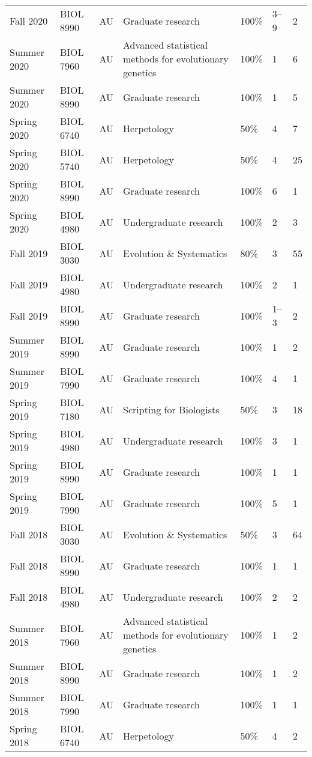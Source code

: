 {\begin{longtable}[l]{ p{0.79in} p{0.65in} p{0.60in} p{1.7in} p{0.58in} p{0.34in} p{0.70in} }
    Fall 2020 & BIOL 8990 & AU & Graduate research & 100\% & 3--9 & 2 \\ 
    Summer 2020 & BIOL 7960 & AU & Advanced statistical methods for evolutionary genetics & 100\% & 1 & 6 \\
    Summer 2020 & BIOL 8990 & AU & Graduate research & 100\% & 1 & 5 \\ 
    Spring 2020 & BIOL 6740 & AU & Herpetology & 50\% & 4 & 7 \\
    Spring 2020 & BIOL 5740 & AU & Herpetology & 50\% & 4 & 25 \\
    Spring 2020 & BIOL 8990 & AU & Graduate research & 100\% & 6 & 1 \\ 
    Spring 2020 & BIOL 4980 & AU & Undergraduate research & 100\% & 2 & 3 \\ 
    Fall 2019 & BIOL 3030 & AU & Evolution \& Systematics & 80\% & 3 & 55 \\
    Fall 2019 & BIOL 4980 & AU & Undergraduate research & 100\% & 2 & 1 \\ 
    Fall 2019 & BIOL 8990 & AU & Graduate research & 100\% & 1--3 & 2 \\ 
    Summer 2019 & BIOL 8990 & AU & Graduate research & 100\% & 1 & 2 \\ 
    Summer 2019 & BIOL 7990 & AU & Graduate research & 100\% & 4 & 1 \\ 
    Spring 2019 & BIOL 7180 & AU & Scripting for Biologists & 50\% & 3 & 18 \\
    Spring 2019 & BIOL 4980 & AU & Undergraduate research & 100\% & 3 & 1 \\ 
    Spring 2019 & BIOL 8990 & AU & Graduate research & 100\% & 1 & 1 \\ 
    Spring 2019 & BIOL 7990 & AU & Graduate research & 100\% & 5 & 1 \\ 
    Fall 2018 & BIOL 3030 & AU & Evolution \& Systematics & 50\% & 3 & 64 \\
    Fall 2018 & BIOL 8990 & AU & Graduate research & 100\% & 1 & 1 \\ 
    Fall 2018 & BIOL 4980 & AU & Undergraduate research & 100\% & 2 & 2 \\ 
    Summer 2018 & BIOL 7960 & AU & Advanced statistical methods for evolutionary genetics & 100\% & 1 & 2 \\
    Summer 2018 & BIOL 8990 & AU & Graduate research & 100\% & 1 & 2 \\ 
    Summer 2018 & BIOL 7990 & AU & Graduate research & 100\% & 1 & 1 \\ 
    Spring 2018 & BIOL 6740 & AU & Herpetology & 50\% & 4 & 2 \\

\end{longtable}}
